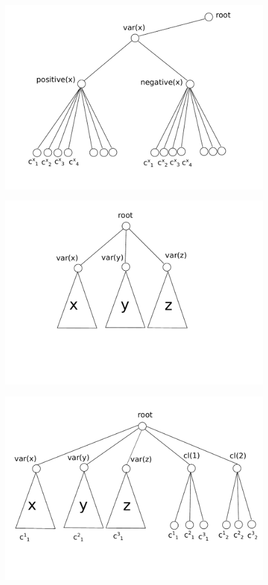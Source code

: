 \begin{figure}[htbp]
\includegraphics[width = \columnwidth]{figs/gadget-no-bw.pdf}
\end{figure}


\begin{figure}[htbp]
\includegraphics[width = \columnwidth]{figs/vc-instance.pdf}
\end{figure}


\begin{figure}[htbp]
\includegraphics[width = \columnwidth]{figs/vc-instance-r2.pdf}
\end{figure}


